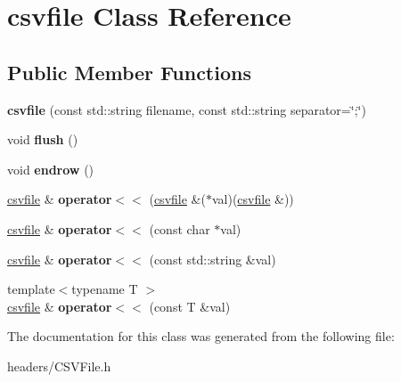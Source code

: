 \hypertarget{classcsvfile}{}\section{csvfile Class Reference}
\label{classcsvfile}
\subsection*{Public Member Functions}
\begin{DoxyCompactItemize}
\item 
\mbox{\label{classcsvfile_a22aee506583f5fd125a8f8f3dcccff3b}} 
{\bfseries csvfile} (const std\+::string filename, const std\+::string separator=\char`\"{};\char`\"{})
\item 
\mbox{\label{classcsvfile_a5955a8c1fea1af1c95a388aac391fada}} 
void {\bfseries flush} ()
\item 
\mbox{\label{classcsvfile_afd878cbd74e1be9aa7e33bdf7f70e9ef}} 
void {\bfseries endrow} ()
\item 
\mbox{\label{classcsvfile_aee44e4a9c1826eba97f476ba24572356}} 
\hyperlink{classcsvfile}{csvfile} \& {\bfseries operator$<$$<$} (\hyperlink{classcsvfile}{csvfile} \&($\ast$val)(\hyperlink{classcsvfile}{csvfile} \&))
\item 
\mbox{\label{classcsvfile_a2b9cd9120377c5e325b8d33ac17c7497}} 
\hyperlink{classcsvfile}{csvfile} \& {\bfseries operator$<$$<$} (const char $\ast$val)
\item 
\mbox{\label{classcsvfile_a3850513edbfe4b488cfd4a5bac2f15e6}} 
\hyperlink{classcsvfile}{csvfile} \& {\bfseries operator$<$$<$} (const std\+::string \&val)
\item 
\mbox{\label{classcsvfile_ad00150e1310d31fd4f27801e52a3d7a5}} 
{\footnotesize template$<$typename T $>$ }\\\hyperlink{classcsvfile}{csvfile} \& {\bfseries operator$<$$<$} (const T \&val)
\end{DoxyCompactItemize}


The documentation for this class was generated from the following file\+:\begin{DoxyCompactItemize}
\item 
headers/C\+S\+V\+File.\+h\end{DoxyCompactItemize}
